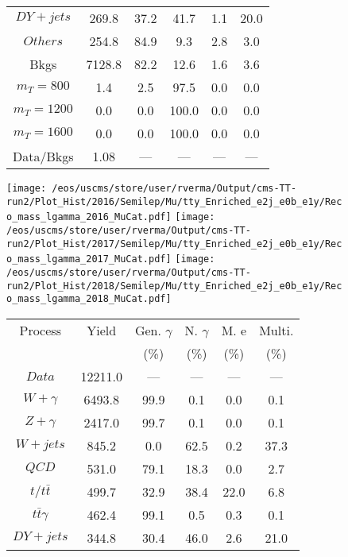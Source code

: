 \begin{figure}
\begin{minipage}[c]{0.32\textwidth}
{\begin{tabular}{cccccc}
$ DY+jets $ &  269.8 &  37.2 &  41.7 &  1.1 &  20.0\\
$ Others $ &  254.8 &  84.9 &  9.3 &  2.8 &  3.0\\
Bkgs &  7128.8 &  82.2 &  12.6 &  1.6 &  3.6\\
$ m_{T} = 800 $ &  1.4 &  2.5 &  97.5 &  0.0 &  0.0\\
$ m_{T} = 1200 $ &  0.0 &  0.0 &  100.0 &  0.0 &  0.0\\
$ m_{T} = 1600 $ &  0.0 &  0.0 &  100.0 &  0.0 &  0.0\\
Data/Bkgs &  1.08 &  --- &  --- &  --- &  ---\\
\hline
\end{tabular}
}
\end{minipage}
\end{figure}

\begin{figure}
\centering
\texttt{[image: /eos/uscms/store/user/rverma/Output/cms-TT-run2/Plot\_Hist/2016/Semilep/Mu/tty\_Enriched\_e2j\_e0b\_e1y/Reco\_mass\_lgamma\_2016\_MuCat.pdf]}
\texttt{[image: /eos/uscms/store/user/rverma/Output/cms-TT-run2/Plot\_Hist/2017/Semilep/Mu/tty\_Enriched\_e2j\_e0b\_e1y/Reco\_mass\_lgamma\_2017\_MuCat.pdf]}
\texttt{[image: /eos/uscms/store/user/rverma/Output/cms-TT-run2/Plot\_Hist/2018/Semilep/Mu/tty\_Enriched\_e2j\_e0b\_e1y/Reco\_mass\_lgamma\_2018\_MuCat.pdf]}
\begin{minipage}[c]{0.32\textwidth}
\centering
\tiny{
\begin{tabular}{cccccc}
\hline
Process & Yield & Gen. $\gamma$ & N. $\gamma$ & M. e & Multi. \\
 &  & (\%) & (\%) & (\%) & (\%)  \\
\hline
                                                                      $ Data $ &  12211.0 &  --- &  --- &  --- &  ---\\
$ W+\gamma $ &  6493.8 &  99.9 &  0.1 &  0.0 &  0.1\\
$ Z+\gamma $ &  2417.0 &  99.7 &  0.1 &  0.0 &  0.1\\
$ W+jets $ &  845.2 &  0.0 &  62.5 &  0.2 &  37.3\\
$ QCD $ &  531.0 &  79.1 &  18.3 &  0.0 &  2.7\\
$ t/t\bar{t} $ &  499.7 &  32.9 &  38.4 &  22.0 &  6.8\\
$ t\bar{t}\gamma $ &  462.4 &  99.1 &  0.5 &  0.3 &  0.1\\
$ DY+jets $ &  344.8 &  30.4 &  46.0 &  2.6 &  21.0\\

\end{tabular}}
\end{minipage}
\end{figure}
